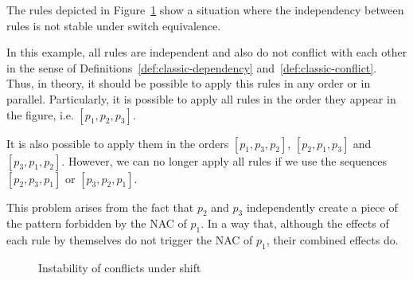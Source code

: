 \begin{example}\label{ex:process:instability}The rules depicted in Figure~\ref{fig:process:instability} show a situation where the independency between rules is not stable under switch equivalence.

  In this example, all rules are independent and also do not conflict with each other in the sense of Definitions~\ref{def:classic-dependency} and~\ref{def:classic-conflict}. Thus, in theory, it should be possible to apply this rules in any order or in parallel. Particularly, it is possible to apply all rules in the order they appear in the figure, i.e. $[p_1, p_2, p_3]$.

  It is also possible to apply them in the orders $[p_1, p_3, p_2]$, $[p_2, p_1, p_3]$ and $[p_3, p_1, p_2]$. However, we can no longer apply all rules if we use the sequences $[p_2, p_3, p_1]$ or $[p_3, p_2, p_1]$.

  This problem arises from the fact that $p_2$ and $p_3$ independently create a piece of the pattern forbidden by the NAC of $p_1$. In a way that, although the effects of each rule by themselves do not trigger the NAC of $p_1$, their combined effects do.

\begin{figure}[!ht]
  \centering
  \caption{Instability of conflicts under shift\\}\label{fig:process:instability}
\end{figure}

\end{example}

